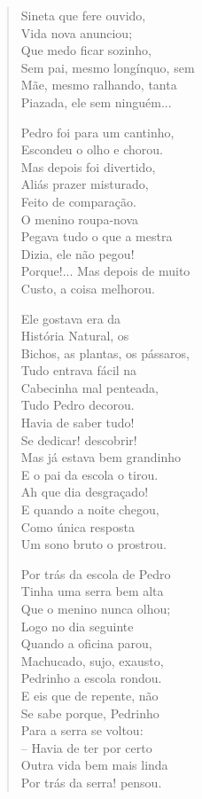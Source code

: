 \begin{verse}
Sineta que fere ouvido,\\
Vida nova anunciou;\\
Que medo ficar sozinho,\\
Sem pai, mesmo longínquo, sem\\
Mãe, mesmo ralhando, tanta\\
Piazada, ele sem ninguém...

Pedro foi para um cantinho,\\
Escondeu o olho e chorou.\\
Mas depois foi divertido,\\
Aliás prazer misturado,\\
Feito de comparação.\\
O menino roupa-nova\\
Pegava tudo o que a mestra\\
Dizia, ele não pegou!\\
Porque!... Mas depois de muito\\
Custo, a coisa melhorou.

Ele gostava era da\\
História Natural, os\\
Bichos, as plantas, os pássaros,\\
Tudo entrava fácil na\\
Cabecinha mal penteada,\\
Tudo Pedro decorou.\\
Havia de saber tudo!\\
Se dedicar! descobrir!\\
Mas já estava bem grandinho\\
E o pai da escola o tirou.\\
Ah que dia desgraçado!\\
E quando a noite chegou,\\
Como única resposta\\
Um sono bruto o prostrou.

Por trás da escola de Pedro\\
Tinha uma serra bem alta\\
Que o menino nunca olhou;\\
Logo no dia seguinte\\
Quando a oficina parou,\\
Machucado, sujo, exausto,\\
Pedrinho a escola rondou.\\
E eis que de repente, não\\
Se sabe porque, Pedrinho\\
Para a serra se voltou:\\
-- Havia de ter por certo\\
Outra vida bem mais linda\\
Por trás da serra! pensou.


\end{verse}
